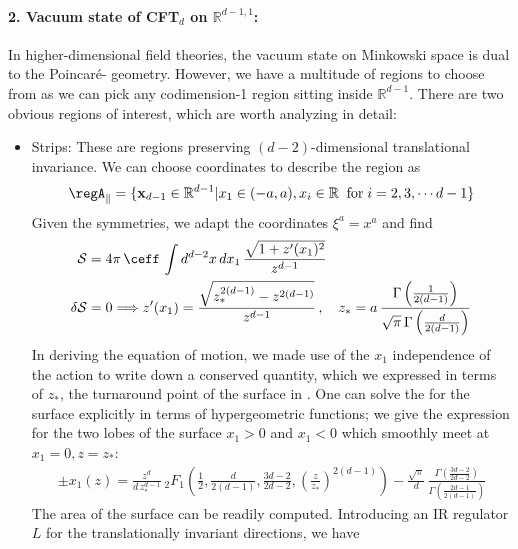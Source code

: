 \documentclass[12pt,openany]{book}
\begin{document}
\paragraph{2. Vacuum state of CFT$_d$ on ${\mathbb R}^{d-1,1}$:} In higher-dimensional field theories, the vacuum state on Minkowski space is  dual to the Poincar\'e- geometry. However, we have a multitude of regions to choose from as we can pick any codimension-1 region sitting inside ${\mathbb R}^{d-1}$. There are two obvious regions of interest, which are worth analyzing in detail:
\begin{itemize}
\item Strips: These are regions preserving $(d-2)$-dimensional translational invariance. We can choose coordinates to describe the region as
%
\begin{equation}
\regA_{\parallel} = \{ {\bf x}_{d-1} \in {\mathbb R}^{d-1} | x_1 \in (-a,a),   x_i \in {\mathbb R} \;\; \text{for}\; i = 2, 3, \cdots d-1  \}
\label{eq:stripdef}
\end{equation}
%
Given the symmetries, we adapt the coordinates $\xi^a =x^a$ and find
%
\begin{equation}
\begin{split}
{\cal S} &= 4\pi\, \ceff \, \int d^{d-2}x \, dx_1\, \frac{\sqrt{1+ z'(x_1)^2}}{z^{d-1}}
 \\
\delta {\cal S} &=0 \Longrightarrow z'(x_1) = \frac{\sqrt{z_*^{2(d-1)} - z^{2(d-1)}}}{z^{d-1}} \,, \quad
z_* = a\, \frac{\Gamma\left(\frac{1}{2(d-1)}\right)}{\sqrt{\pi}\, \Gamma\left(\frac{d}{2(d-1)}\right)}
\end{split}
\label{}
\end{equation}
%
In deriving the equation of motion, we made use of the $x_1$ independence of the action to write down a conserved quantity, which we expressed in terms of  $z_*$, the turnaround point of the surface in \AdS. One can solve the for the surface explicitly in terms of hypergeometric functions; we give the expression for the two lobes of the  surface $x_1>0$ and $x_1<0$ which smoothly meet at $x_1 =0, z=z_*$:
%
\begin{align}
\pm x_1(z) =  \frac{z^d}{d\, z_*^{d-1}} \ _2F_1 \left(\frac{1}{2}, \frac{d}{2(d-1)}, \frac{3d-2}{2d-2} , \left(\frac{z}{z_*}\right)^{2(d-1)} \right) - \frac{\sqrt{\pi}}{d} \, \frac{\Gamma\left(\frac{3d-2}{2d-2}\right)}{\Gamma\left(\frac{2d-1}{2(d-1)}\right)}
\label{}
\end{align}
%
The area of the surface can be readily computed. Introducing an IR regulator $L$ for the translationally invariant directions, we have

\end{itemize}
\end{document}
